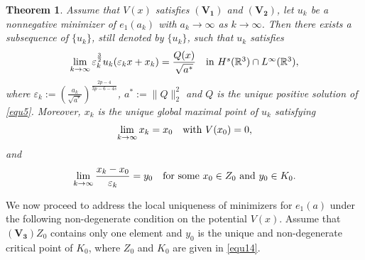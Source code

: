 \documentclass[reqno, 11pt]{amsart} %
\numberwithin{equation}{section}
\newtheorem{theorem}{Theorem}[section]
\begin{document}
	\begin{theorem}\label{the2}
		Assume that $V(x)$ satisfies $\mathbf{(V_1)}$ and $\mathbf{(V_2)}$, let $u_{k}$ be a nonnegative minimizer of $e_{1}(a_{k})$ with $a_{k}\rightarrow\infty$ as $k\rightarrow\infty$. Then there exists a subsequence of $\{u_{k}\}$, still denoted by $\{u_{k}\}$, such that $u_{k}$ satisfies
		\begin{equation}\label{equ15}
			\lim_{k\rightarrow\infty}\varepsilon_{k}^{\frac{3}{2}}u_{k}(\varepsilon_{k}x+x_{k})=\frac{Q(x)}{\sqrt{a^{\ast}}}\quad \hbox{in $H^{s}(\mathbb{R}^{3})\cap L^{\infty}(\mathbb{R}^{3})$},
		\end{equation}
		where $\varepsilon_{k}:=\left(\frac{a_{k}}{\sqrt{a^{\ast}}}\right)^{\frac{2p-4}{3p-6-4s}}$, $a^{\ast}:=\|Q\|_{2}^{2}$ and $Q$ is the unique positive solution of \eqref{equ5}. Moreover, $x_{k}$ is the unique global maximal point of $u_{k}$ satisfying
		\begin{equation}\label{equ16}
			\lim\limits_{k\rightarrow \infty}x_{k}=x_{0}\quad \hbox{with $V(x_{0})=0$},
		\end{equation}
		and
		\begin{equation}\label{equ17}
			\lim\limits_{k\rightarrow \infty}\frac{x_{k}-x_{0}}{\varepsilon_{k}}=y_{0} \quad \hbox{for some $x_{0}\in Z_{0}$ and $y_{0}\in K_{0}$}.
		\end{equation}
	\end{theorem}
	
	We now proceed to address the local uniqueness of minimizers for $e_{1}(a)$ under the following non-degenerate condition on the potential $V(x)$. Assume that\\
	
	$\mathbf{(V_3)}$\quad $Z_{0}$ contains only one element and $y_0$ is the unique and non-degenerate critical point of $K_{0}$, where $Z_{0}$ and $K_{0}$ are given in \eqref{equ14}. 
	
	

	
	
\end{document}
